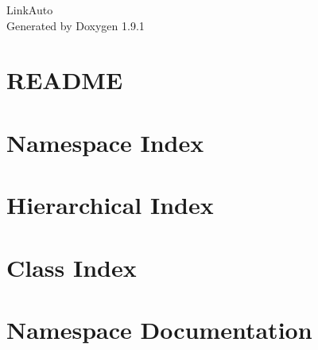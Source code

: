 \let\mypdfximage\pdfximage\def\pdfximage{\immediate\mypdfximage}\documentclass[twoside]{book}
\newcommand{\+}{\discretionary{\mbox{\scriptsize$\hookleftarrow$}}{}{}}
\newcommand{\clearemptydoublepage}{%
  \newpage{\pagestyle{empty}\cleardoublepage}%
}
\begin{document}
\raggedbottom

\hypersetup{pageanchor=false,
             bookmarksnumbered=true,
             pdfencoding=unicode
            }
\begin{titlepage}
\vspace*{7cm}
\begin{center}%
{\Large Link\+Auto }\\
\vspace*{1cm}
{\large Generated by Doxygen 1.9.1}\\
\end{center}
\end{titlepage}
\clearemptydoublepage
{}
\tableofcontents
\clearemptydoublepage
{}
\hypersetup{pageanchor=true}

\chapter{README}
\label{md__r_e_a_d_m_e}

\chapter{Namespace Index}

\chapter{Hierarchical Index}

\chapter{Class Index}

\chapter{Namespace Documentation}


\end{document}
